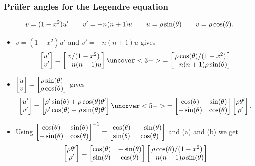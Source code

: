 \documentclass[9pt]{beamer}
\begin{document}
\begin{frame}[t]
 \frametitle{Pr\"ufer angles for the Legendre equation}

 \[ v = (1-x^2)u' \qquad v' = -n(n+1)u \qquad
    u = \rho\sin(\theta) \qquad v = \rho\cos(\theta).
 \] 

 \reminderbar

 \begin{itemize}
  \item<2->[(a)] $v=(1-x^2)u'$ and $v'=-n(n+1)u$ gives
   \[\bbm u'\\ v'\ebm = \bbm v/(1-x^2)\\ -n(n+1)u \ebm \uc<3->{= 
      \bbm \rho\cos(\tht)/(1-x^2) \\ -n(n+1)\rho\sin(\tht)\ebm}
   \]
  \item<4->[(b)] $\displaystyle\left[\begin{matrix} u\\ v\end{matrix}\right] = 
   \left[\begin{matrix}\rho\sin(\theta)\\\rho\cos(\theta)\end{matrix}\right]$ gives
   \[ \bbm u'\\ v'\ebm = 
      \bbm \rho'\sin(\tht) + \rho\cos(\tht)\tht' \\
           \rho'\cos(\tht) - \rho\sin(\tht)\tht' \ebm \uc<5->{=
      \bbm\cos(\tht) & \sin(\tht) \\-\sin(\tht)&\cos(\tht) \ebm
      \bbm \rho\tht' \\ \rho' \ebm.}
   \]
  \item<6->[(c)] Using 
   $\left[\begin{matrix}\cos(\theta) & \sin(\theta) \\-\sin(\theta)&\cos(\theta) \end{matrix}\right]^{-1}=
    \left[\begin{matrix}\cos(\theta) & -\sin(\theta) \\\sin(\theta)&\cos(\theta) \end{matrix}\right]$
   and (a) and (b) we get
   \[ \left[\begin{matrix}\rho\theta'\\\rho'\end{matrix}\right] =
       \left[\begin{matrix}\cos(\theta) & -\sin(\theta) \\\sin(\theta)&\cos(\theta) \end{matrix}\right]
       \left[\begin{matrix} \rho\cos(\theta)/(1-x^2) \\ -n(n+1)\rho\sin(\theta)\end{matrix}\right]
   \]
 \end{itemize}
\end{frame}
\end{document}
